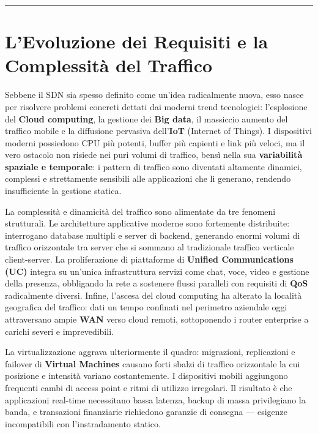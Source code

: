 \documentclass[
  italian,
  openany]{book}
\begin{document}
\begin{center}\rule{0.5\linewidth}{0.5pt}\end{center}

\section{L'Evoluzione dei Requisiti e la Complessità del
Traffico}\label{levoluzione-dei-requisiti-e-la-complessituxe0-del-traffico}

Sebbene il SDN sia spesso definito come un'idea radicalmente nuova, esso
nasce per risolvere problemi concreti dettati dai moderni trend
tecnologici: l'esplosione del \textbf{Cloud computing}, la gestione dei
\textbf{Big data}, il massiccio aumento del traffico mobile e la
diffusione pervasiva dell'\textbf{IoT} (Internet of Things). I
dispositivi moderni possiedono CPU più potenti, buffer più capienti e
link più veloci, ma il vero ostacolo non risiede nei puri volumi di
traffico, bensì nella sua \textbf{variabilità spaziale e temporale}: i
pattern di traffico sono diventati altamente dinamici, complessi e
strettamente sensibili alle applicazioni che li generano, rendendo
insufficiente la gestione statica.

La complessità e dinamicità del traffico sono alimentate da tre fenomeni
strutturali. Le architetture applicative moderne sono fortemente
distribuite: interrogano database multipli e server di backend,
generando enormi volumi di traffico orizzontale tra server che si
sommano al tradizionale traffico verticale client-server. La
proliferazione di piattaforme di \textbf{Unified Communications (UC)}
integra su un'unica infrastruttura servizi come chat, voce, video e
gestione della presenza, obbligando la rete a sostenere flussi paralleli
con requisiti di \textbf{QoS} radicalmente diversi. Infine, l'ascesa del
cloud computing ha alterato la località geografica del traffico: dati un
tempo confinati nel perimetro aziendale oggi attraversano ampie
\textbf{WAN} verso cloud remoti, sottoponendo i router enterprise a
carichi severi e imprevedibili.

La virtualizzazione aggrava ulteriormente il quadro: migrazioni,
replicazioni e failover di \textbf{Virtual Machines} causano forti
sbalzi di traffico orizzontale la cui posizione e intensità variano
costantemente. I dispositivi mobili aggiungono frequenti cambi di access
point e ritmi di utilizzo irregolari. Il risultato è che applicazioni
real-time necessitano bassa latenza, backup di massa privilegiano la
banda, e transazioni finanziarie richiedono garanzie di consegna ---
esigenze incompatibili con l'instradamento statico.
\end{document}

